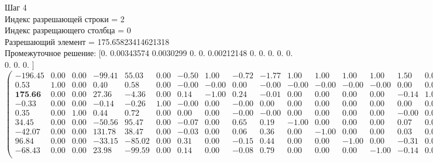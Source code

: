 \documentclass{article}
\begin{document}
\begin{flushleft}
    Шаг 4\\
Индекс разрешающей строки = 2\\
Индекс разрещающего столбца = 0\\
Разрешающий элемент = 175.65823414621318\\
Промежуточное решение:
 [0.         0.00343574 0.0030299  0.         0.         0.00212148
 0.         0.         0.         0.         0.         0.
 0.         0.        ]
\begin{equation*}
\begin{pmatrix}
 -196.45 & 0.00 & 0.00 & -99.41 &  55.03 & 0.00 & -0.50 &  1.00 & -0.72 & -1.77 &  1.00 &  1.00 &  1.00 &  1.00 &  1.50 & 0.00 &  1.72 &  2.77 & 0.00 & 0.00 & 0.00 & 0.00 & -2.01 \\
    0.53 & 1.00 & 0.00 &   0.40 &   0.58 & 0.00 & -0.00 & -0.00 &  0.00 & -0.00 & -0.00 & -0.00 & -0.00 & -0.00 &  0.00 & 0.00 & -0.00 &  0.00 & 0.00 & 0.00 & 0.00 & 0.00 &  0.00 \\
  \textbf{175.66} & 0.00 & 0.00 &  27.36 &  -4.36 & 0.00 &  0.14 & -1.00 &  0.24 & -0.01 &  0.00 &  0.00 &  0.00 &  0.00 & -0.14 & 1.00 & -0.24 &  0.01 & 0.00 & 0.00 & 0.00 & 0.00 &  0.63 \\
   -0.33 & 0.00 & 0.00 &  -0.14 &  -0.26 & 1.00 & -0.00 &  0.00 & -0.00 &  0.00 &  0.00 &  0.00 &  0.00 &  0.00 &  0.00 & 0.00 &  0.00 & -0.00 & 0.00 & 0.00 & 0.00 & 0.00 &  0.00 \\
    0.35 & 0.00 & 1.00 &   0.44 &   0.72 & 0.00 &  0.00 &  0.00 & -0.00 & -0.00 &  0.00 &  0.00 &  0.00 &  0.00 & -0.00 & 0.00 &  0.00 &  0.00 & 0.00 & 0.00 & 0.00 & 0.00 &  0.00 \\
   34.45 & 0.00 & 0.00 & -50.56 &  95.47 & 0.00 & -0.07 &  0.00 &  0.65 &  0.19 & -1.00 &  0.00 &  0.00 &  0.00 &  0.07 & 0.00 & -0.65 & -0.19 & 1.00 & 0.00 & 0.00 & 0.00 &  0.23 \\
  -42.07 & 0.00 & 0.00 & 131.78 &  38.47 & 0.00 & -0.03 &  0.00 &  0.06 &  0.36 &  0.00 & -1.00 &  0.00 &  0.00 &  0.03 & 0.00 & -0.06 & -0.36 & 0.00 & 1.00 & 0.00 & 0.00 &  0.61 \\
   96.84 & 0.00 & 0.00 & -33.15 & -85.02 & 0.00 &  0.31 &  0.00 & -0.15 &  0.44 &  0.00 &  0.00 & -1.00 &  0.00 & -0.31 & 0.00 &  0.15 & -0.44 & 0.00 & 0.00 & 1.00 & 0.00 &  0.40 \\
  -68.43 & 0.00 & 0.00 &  23.98 & -99.59 & 0.00 &  0.14 &  0.00 & -0.08 &  0.79 &  0.00 &  0.00 &  0.00 & -1.00 & -0.14 & 0.00 &  0.08 & -0.79 & 0.00 & 0.00 & 0.00 & 1.00 &  0.14 \\
\end{pmatrix}
\end{equation*}
\end{flushleft}
\end{document}
